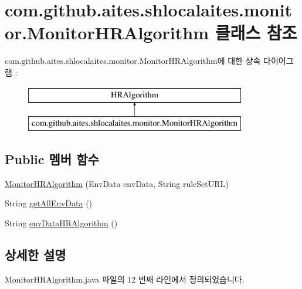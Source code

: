 \hypertarget{classcom_1_1github_1_1aites_1_1shlocalaites_1_1monitor_1_1_monitor_h_r_algorithm}{}\section{com.\+github.\+aites.\+shlocalaites.\+monitor.\+Monitor\+H\+R\+Algorithm 클래스 참조}
\label{classcom_1_1github_1_1aites_1_1shlocalaites_1_1monitor_1_1_monitor_h_r_algorithm}
com.\+github.\+aites.\+shlocalaites.\+monitor.\+Monitor\+H\+R\+Algorithm에 대한 상속 다이어그램 \+: \begin{figure}[H]
\begin{center}
\leavevmode
\includegraphics[height=2.000000cm]{classcom_1_1github_1_1aites_1_1shlocalaites_1_1monitor_1_1_monitor_h_r_algorithm}
\end{center}
\end{figure}
\subsection*{Public 멤버 함수}
\begin{DoxyCompactItemize}
\item 
\mbox{\hyperlink{classcom_1_1github_1_1aites_1_1shlocalaites_1_1monitor_1_1_monitor_h_r_algorithm_a7f58ce878fbdfbaebec96b1bd75316ec}{Monitor\+H\+R\+Algorithm}} (Env\+Data env\+Data, String rule\+Set\+U\+RL)
\item 
String \mbox{\hyperlink{classcom_1_1github_1_1aites_1_1shlocalaites_1_1monitor_1_1_monitor_h_r_algorithm_a33bf99dd8b34a44dd2126b71f868dbb1}{get\+All\+Env\+Data}} ()
\item 
String \mbox{\hyperlink{classcom_1_1github_1_1aites_1_1shlocalaites_1_1monitor_1_1_monitor_h_r_algorithm_a555e88ef7e71714bf570eecf8588cc41}{env\+Data\+H\+R\+Algorithm}} ()
\end{DoxyCompactItemize}


\subsection{상세한 설명}


Monitor\+H\+R\+Algorithm.\+java 파일의 12 번째 라인에서 정의되었습니다.



